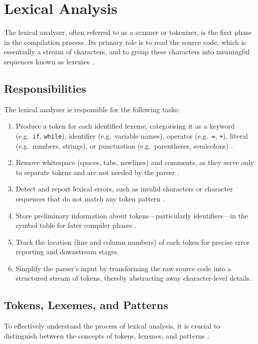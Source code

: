 
\section{Lexical Analysis}

The lexical analyser, often referred to as a scanner or tokenizer, is the first phase in the compilation process. Its primary role is to read the source code, which is essentially a stream of characters, and to group these characters into meaningful sequences known as lexemes \cite{aho2007compilers}. 

\subsection{Responsibilities}

The lexical analyser is responsible for the following tasks:
\begin{enumerate}
  \item Produce a token for each identified lexeme, categorising it as a keyword (e.g.\ \texttt{if}, \texttt{while}), identifier (e.g.\ variable names), operator (e.g.\ \texttt{=}, \texttt{+}), literal (e.g.\ numbers, strings), or punctuation (e.g.\ parentheses, semicolons) \cite{aho2007compilers}.
  \item Remove whitespace (spaces, tabs, newlines) and comments, as they serve only to separate tokens and are not needed by the parser \cite{aho2007compilers}.
  \item Detect and report lexical errors, such as invalid characters or character sequences that do not match any token pattern \cite{aho2007compilers}.
  \item Store preliminary information about tokens—particularly identifiers—in the symbol table for later compiler phases \cite{aho2007compilers}.
  \item Track the location (line and column numbers) of each token for precise error reporting and downstream stages.
  \item Simplify the parser’s input by transforming the raw source code into a structured stream of tokens, thereby abstracting away character-level details.
\end{enumerate}

\subsection{Tokens, Lexemes, and Patterns}

To effectively understand the process of lexical analysis, it is crucial to distinguish between the concepts of tokens, lexemes, and patterns \cite{aho2007compilers}. 

